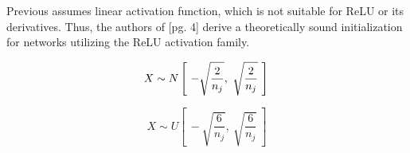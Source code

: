 \documentclass[12pt]{article}
\begin{document}
Previous assumes linear activation function, which is not suitable for ReLU or its derivatives. Thus, the authors of \cite{he15}[pg. 4] derive a theoretically sound initialization for networks utilizing the ReLU activation family.

\begin{equation}
    X \sim N \left[~-\sqrt{\frac{2}{n_{j}}},~\sqrt{\frac{2}{n_{j}}}~\right]\\
    \label{eq:he:normal}
\end{equation}

\begin{equation}
    X \sim U \left[~-\sqrt{\frac{6}{n_{j}}},~\sqrt{\frac{6}{n_{j}}}~\right]
    \label{eq:he:uniform}
\end{equation}



\end{document}
